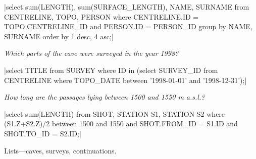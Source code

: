 |select sum(LENGTH), sum(SURFACE_LENGTH), NAME, SURNAME
  from CENTRELINE, TOPO, PERSON
  where CENTRELINE.ID = TOPO.CENTRELINE_ID and PERSON.ID = PERSON_ID
  group by NAME, SURNAME order by 1 desc, 4 asc;|

{\it Which parts of the cave were surveyed in the year 1998?}

|select TITLE from SURVEY where ID in
  (select SURVEY_ID from CENTRELINE
  where TOPO_DATE between '1998-01-01' and '1998-12-31');|

{\it How long are the passages lying between 1500 and 1550 m a.s.l.?}

|select sum(LENGTH) from SHOT, STATION S1, STATION S2
  where (S1.Z+S2.Z)/2 between 1500 and 1550 and
  SHOT.FROM_ID = S1.ID and SHOT.TO_ID = S2.ID;|

\subsubchapter Lists---caves, surveys, continuations.

